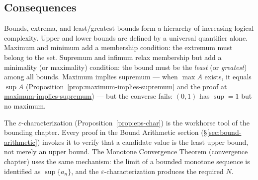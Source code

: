 \subsection*{Consequences}

\begin{remark*}
Bounds, extrema, and least/greatest bounds form a hierarchy of increasing
logical complexity.
Upper and lower bounds are defined by a universal quantifier alone.
Maximum and minimum add a membership condition: the extremum must belong
to the set.
Supremum and infimum relax membership but add a minimality (or maximality)
condition: the bound must be the \emph{least} (or \emph{greatest}) among
all bounds.
Maximum implies supremum --- when $\max A$ exists, it equals $\sup A$
(Proposition~\ref{prop:maximum-implies-supremum} and the proof at
\hyperref[prf:maximum-implies-supremum]{maximum-implies-supremum}) --- but the converse fails:
$(0,1)$ has $\sup = 1$ but no maximum.
\end{remark*}

\begin{remark*}
The $\varepsilon$-characterization (Proposition~\ref{prop:eps-char}) is the
workhorse tool of the bounding chapter.
Every proof in the Bound Arithmetic section
(\S\ref{sec:bound-arithmetic}) invokes it to verify that a candidate value
is the least upper bound, not merely an upper bound.
The Monotone Convergence Theorem (convergence chapter) uses the same
mechanism: the limit of a bounded monotone sequence is identified as
$\sup\{a_n\}$, and the $\varepsilon$-characterization produces the required
$N$.
\end{remark*}















































